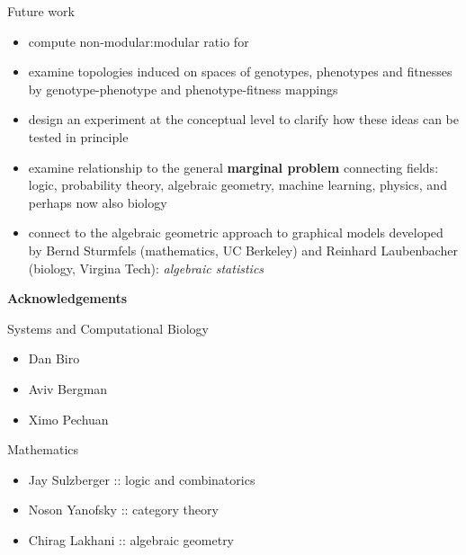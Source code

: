 	\begin{frame}
	\begin{footnotesize}	
	\begin{block}{Future work}
	\begin{itemize}
	\item compute non-modular:modular ratio for 
	\begin{enumerate}
	\end{enumerate}	 
	\item examine topologies induced on spaces of genotypes, phenotypes and fitnesses by genotype-phenotype and phenotype-fitness mappings
	\item design an experiment at the conceptual level to clarify how these ideas can be tested in principle
	\item examine relationship to the general \textbf{marginal problem} connecting fields: logic, probability theory, algebraic geometry, machine learning, physics, and perhaps now also biology
	\item connect to the algebraic geometric approach to graphical models developed by Bernd Sturmfels (mathematics, UC Berkeley) and Reinhard Laubenbacher (biology, Virgina Tech): \emph{algebraic statistics}
	\end{itemize}		
	\end{block}
	\end{footnotesize}
	\end{frame}
	
	\begin{frame}
	\textbf{Acknowledgements}
	\begin{block}{Systems and Computational Biology}
	\begin{small}	
	\begin{itemize}
	\item Dan Biro
	\item Aviv Bergman
	\item Ximo Pechuan
	\end{itemize}		
	\end{small}
	\end{block}
	\begin{block}{Mathematics}
	\begin{small}	
	\begin{itemize}
	\item Jay Sulzberger :: logic and combinatorics
	\item Noson Yanofsky :: category theory
	\item Chirag Lakhani :: algebraic geometry
	\end{itemize}		
	\end{small}
	\end{block}
	\end{frame}
	
%	
	
